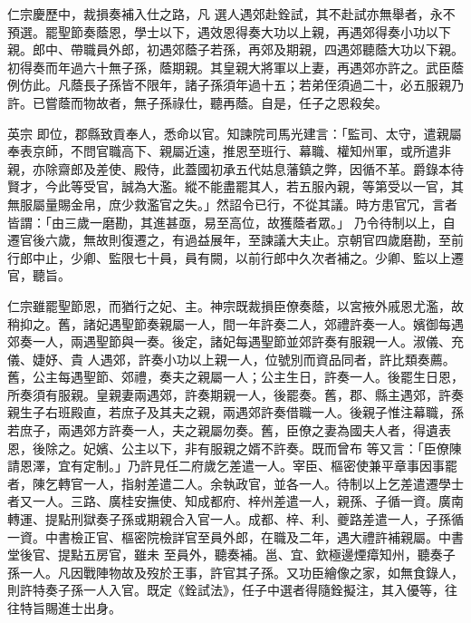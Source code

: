 \begin{pinyinscope}
 仁宗慶歷中，裁損奏補入仕之路，凡
 選人遇郊赴銓試，其不赴試亦無舉者，永不預選。罷聖節奏蔭恩，學士以下，遇效恩得奏大功以上親，再遇郊得奏小功以下親。郎中、帶職員外郎，初遇郊蔭子若孫，再郊及期親，四遇郊聽蔭大功以下親。初得奏而年過六十無子孫，蔭期親。其皇親大將軍以上妻，再遇郊亦許之。武臣蔭例仿此。凡蔭長子孫皆不限年，諸子孫須年過十五；若弟侄須過二十，必五服親乃許。已嘗蔭而物故者，無子孫祿仕，聽再蔭。自是，任子之恩殺矣。



 英宗
 即位，郡縣致貢奉人，悉命以官。知諫院司馬光建言：「監司、太守，遣親屬奉表京師，不問官職高下、親屬近遠，推恩至班行、幕職、權知州軍，或所遣非親，亦除齋郎及差使、殿侍，此蓋國初承五代姑息藩鎮之弊，因循不革。爵錄本待賢才，今此等受官，誠為大濫。縱不能盡罷其人，若五服內親，等第受以一官，其無服屬量賜金帛，庶少救濫官之失。」然詔令已行，不從其議。時方患官冗，言者皆謂：「由三歲一磨勘，其進甚亟，易至高位，故獲蔭者眾。」
 乃令待制以上，自遷官後六歲，無故則復遷之，有過益展年，至諫議大夫止。京朝官四歲磨勘，至前行郎中止，少卿、監限七十員，員有闕，以前行郎中久次者補之。少卿、監以上遷官，聽旨。



 仁宗雖罷聖節恩，而猶行之妃、主。神宗既裁損臣僚奏蔭，以宮掖外戚恩尤濫，故稍抑之。舊，諸妃遇聖節奏親屬一人，間一年許奏二人，郊禮許奏一人。嬪御每遇郊奏一人，兩遇聖節與一奏。後定，諸妃每遇聖節並郊許奏有服親一人。淑儀、充儀、婕妤、貴
 人遇郊，許奏小功以上親一人，位號別而資品同者，許比類奏薦。舊，公主每遇聖節、郊禮，奏夫之親屬一人；公主生日，許奏一人。後罷生日恩，所奏須有服親。皇親妻兩遇郊，許奏期親一人，後罷奏。舊，郡、縣主遇郊，許奏親生子右班殿直，若庶子及其夫之親，兩遇郊許奏借職一人。後親子惟注幕職，孫若庶子，兩遇郊方許奏一人，夫之親屬勿奏。舊，臣僚之妻為國夫人者，得遺表恩，後除之。妃嬪、公主以下，非有服親之婿不許奏。既而曾布
 等又言：「臣僚陳請恩澤，宜有定制。」乃許見任二府歲乞差遣一人。宰臣、樞密使兼平章事因事罷者，陳乞轉官一人，指射差遣二人。余執政官，並各一人。待制以上乞差遣遷學士者又一人。三路、廣桂安撫使、知成都府、梓州差遣一人，親孫、子循一資。廣南轉運、提點刑獄奏子孫或期親合入官一人。成都、梓、利、夔路差遣一人，子孫循一資。中書檢正官、樞密院檢詳官至員外郎，在職及二年，遇大禮許補親屬。中書堂後官、提點五房官，雖未
 至員外，聽奏補。邕、宜、欽極邊煙瘴知州，聽奏子孫一人。凡因戰陣物故及歿於王事，許官其子孫。又功臣繪像之家，如無食錄人，則許特奏子孫一人入官。既定《銓試法》，任子中選者得隨銓擬注，其入優等，往往特旨賜進士出身。




\end{pinyinscope}
